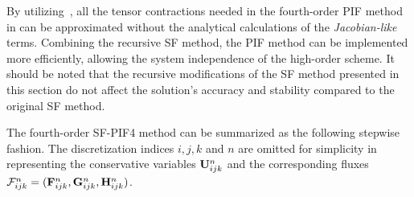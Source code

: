 By utilizing~,
all the tensor contractions needed in the fourth-order PIF method
in  can be approximated without
the analytical calculations of the \textit{Jacobian-like} terms.
Combining the recursive SF method, the PIF method can be implemented more efficiently,
allowing the system independence of the high-order scheme.
It should be noted that the recursive modifications of the SF method
presented in this section do not affect the solution's accuracy and stability
compared to the original SF method.

The fourth-order SF-PIF4 method can be summarized as the following stepwise fashion.
The discretization indices \( i,j,k \) and \( n \) are omitted for simplicity
in representing the conservative variables \( \mathbf{U}^{n}_{ijk} \)
and the corresponding fluxes \( \mathcal{F}^{n}_{ijk} = (\mathbf{F}^{n}_{ijk}, \mathbf{G}^{n}_{ijk}, \mathbf{H}^{n}_{ijk}) \).
